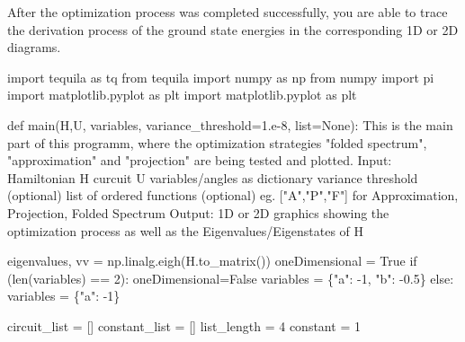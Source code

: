\documentclass[
  letterpaper,
  DIV=11,
  numbers=noendperiod]{scrartcl}
\newenvironment{Shaded}{\begin{snugshade}}{\end{snugshade}}
\newcommand{\BuiltInTok}[1]{\textcolor[rgb]{0.00,0.23,0.31}{#1}}
\newcommand{\CommentTok}[1]{\textcolor[rgb]{0.37,0.37,0.37}{#1}}
\newcommand{\ControlFlowTok}[1]{\textcolor[rgb]{0.00,0.23,0.31}{#1}}
\newcommand{\DecValTok}[1]{\textcolor[rgb]{0.68,0.00,0.00}{#1}}
\newcommand{\FloatTok}[1]{\textcolor[rgb]{0.68,0.00,0.00}{#1}}
\newcommand{\ImportTok}[1]{\textcolor[rgb]{0.00,0.46,0.62}{#1}}
\newcommand{\KeywordTok}[1]{\textcolor[rgb]{0.00,0.23,0.31}{#1}}
\newcommand{\NormalTok}[1]{\textcolor[rgb]{0.00,0.23,0.31}{#1}}
\newcommand{\OperatorTok}[1]{\textcolor[rgb]{0.37,0.37,0.37}{#1}}
\newcommand{\StringTok}[1]{\textcolor[rgb]{0.13,0.47,0.30}{#1}}
\newcommand{\VariableTok}[1]{\textcolor[rgb]{0.07,0.07,0.07}{#1}}
\begin{document}
After the optimization process was completed successfully, you are able
to trace the derivation process of the ground state energies in the
corresponding 1D or 2D diagrams.

\begin{Shaded}
\begin{Highlighting}[]
\ImportTok{import}\NormalTok{ tequila }\ImportTok{as}\NormalTok{ tq}
\ImportTok{from}\NormalTok{ tequila }\ImportTok{import}\NormalTok{ numpy }\ImportTok{as}\NormalTok{ np}
\ImportTok{from}\NormalTok{ numpy }\ImportTok{import}\NormalTok{ pi}
\ImportTok{import}\NormalTok{ matplotlib.pyplot }\ImportTok{as}\NormalTok{ plt}
\ImportTok{import}\NormalTok{ matplotlib.pyplot }\ImportTok{as}\NormalTok{ plt}

\KeywordTok{def}\NormalTok{ main(H,U, variables, variance\_threshold}\OperatorTok{=}\FloatTok{1.e{-}8}\NormalTok{, }\BuiltInTok{list}\OperatorTok{=}\VariableTok{None}\NormalTok{):}
    \CommentTok{\textquotesingle{}\textquotesingle{}\textquotesingle{}This is the main part of this programm, where the optimization strategies "folded spectrum", "approximation" and "projection"}
\CommentTok{    are being tested and plotted.}
\CommentTok{    Input:  Hamiltonian H}
\CommentTok{            curcuit U}
\CommentTok{            variables/angles as dictionary}
\CommentTok{            variance threshold (optional)}
\CommentTok{            list of ordered functions (optional) eg. ["A","P","F"] for Approximation, Projection, Folded Spectrum}
\CommentTok{    Output: 1D or 2D graphics showing the optimization process as well as the Eigenvalues/Eigenstates of H\textquotesingle{}\textquotesingle{}\textquotesingle{}}
    
\NormalTok{    eigenvalues, vv }\OperatorTok{=}\NormalTok{ np.linalg.eigh(H.to\_matrix())}
\NormalTok{    oneDimensional }\OperatorTok{=} \VariableTok{True}
    \ControlFlowTok{if}\NormalTok{ (}\BuiltInTok{len}\NormalTok{(variables) }\OperatorTok{==} \DecValTok{2}\NormalTok{):}
\NormalTok{        oneDimensional}\OperatorTok{=}\VariableTok{False}
\NormalTok{        variables }\OperatorTok{=}\NormalTok{ \{}\StringTok{"a"}\NormalTok{: }\OperatorTok{{-}}\DecValTok{1}\NormalTok{, }\StringTok{"b"}\NormalTok{: }\OperatorTok{{-}}\FloatTok{0.5}\NormalTok{\}}
    \ControlFlowTok{else}\NormalTok{:}
\NormalTok{        variables }\OperatorTok{=}\NormalTok{ \{}\StringTok{"a"}\NormalTok{: }\OperatorTok{{-}}\DecValTok{1}\NormalTok{\}}

\NormalTok{    circuit\_list }\OperatorTok{=}\NormalTok{ []}
\NormalTok{    constant\_list }\OperatorTok{=}\NormalTok{ []}
\NormalTok{    list\_length }\OperatorTok{=} \DecValTok{4}
\NormalTok{    constant }\OperatorTok{=} \DecValTok{1}
    

\end{Highlighting}
\end{Shaded}
\end{document}
